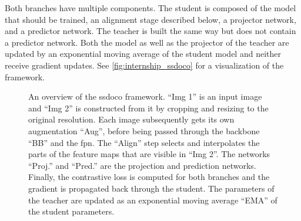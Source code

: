 Both branches have multiple components. The student is composed of the model that should be trained, an alignment stage described below, a projector network, and a predictor network. The teacher is built the same way but does not contain a predictor network. Both the model as well as the projector of the teacher are updated by an exponential moving average of the student model and neither receive gradient updates. See \autoref{fig:internship_ssdoco} for a visualization of the framework.
\begin{figure}
	\centering
	
	\caption[SSDoCo framework]{An overview of the \acrshort{ssdoco} framework. ``Img 1'' is an input image and ``Img 2'' is constructed from it by cropping and resizing to the original resolution. Each image subsequently gets its own augmentation ``Aug'', before being passed through the backbone ``BB'' and the \acrshort{fpn}. The ``Align'' step selects and interpolates the parts of the feature maps that are visible in ``Img 2''. The networks ``Proj.'' and ``Pred.'' are the projection and prediction networks. Finally, the contrastive loss is computed for both branches and the gradient is propagated back through the student. The parameters of the teacher are updated as an exponential moving average ``EMA'' of the student parameters.}\label{fig:internship_ssdoco}
\end{figure}

